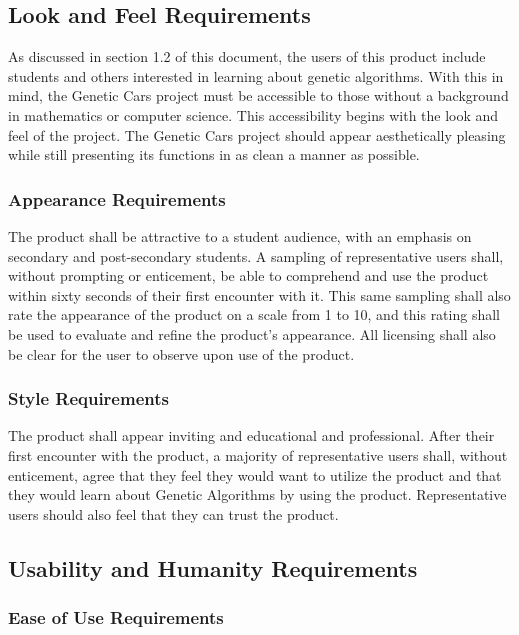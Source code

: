 \documentclass[12pt, titlepage]{article}
\begin{document}
\subsection{Look and Feel Requirements}

As discussed in section 1.2 of this document, the users of this product include students and others interested in learning about genetic algorithms. With this in mind, the Genetic Cars project must be accessible to those without a background in mathematics or computer science. This accessibility begins with the look and feel of the project. The Genetic Cars project should appear aesthetically pleasing while still presenting its functions in as clean a manner as possible.

\subsubsection{Appearance Requirements}

The product shall be attractive to a student audience, with an emphasis on secondary and post-secondary students. A sampling of representative users shall, without prompting or enticement, be able to comprehend and use the product within sixty seconds of their first encounter with it. This same sampling shall also rate the appearance of the product on a scale from 1 to 10, and this rating shall be used to evaluate and refine the product's appearance. All licensing shall also be clear for the user to observe upon use of the product.

\subsubsection{Style Requirements}

The product shall appear inviting and educational and professional. After their first encounter with the product, a majority of representative users shall, without enticement, agree that they feel they would want to utilize the product and that they would learn about Genetic Algorithms by using the product. Representative users should also feel that they can trust the product.

\subsection{Usability and Humanity Requirements}

\subsubsection{Ease of Use Requirements}
\end{document}

